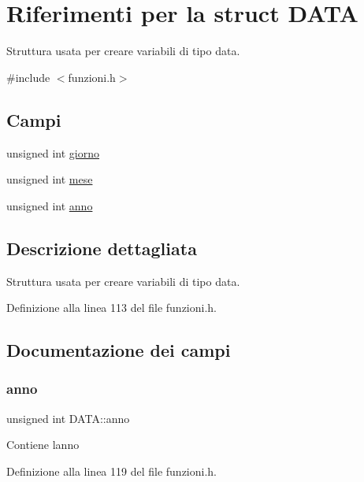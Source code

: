 \hypertarget{struct_d_a_t_a}{}\section{Riferimenti per la struct D\+A\+TA}
\label{struct_d_a_t_a}


Struttura usata per creare variabili di tipo data.  




{\ttfamily \#include $<$funzioni.\+h$>$}

\subsection*{Campi}
\begin{DoxyCompactItemize}
\item 
unsigned int \hyperlink{struct_d_a_t_a_a5b7ee538f851d6654690c7abd5a73e95}{giorno}
\item 
unsigned int \hyperlink{struct_d_a_t_a_a01ae59e2eaf050acfab59d94732ab535}{mese}
\item 
unsigned int \hyperlink{struct_d_a_t_a_a51652b7ccc3b63d704943414ded3c38a}{anno}
\end{DoxyCompactItemize}


\subsection{Descrizione dettagliata}
Struttura usata per creare variabili di tipo data. 

Definizione alla linea 113 del file funzioni.\+h.



\subsection{Documentazione dei campi}
\mbox{\label{struct_d_a_t_a_a51652b7ccc3b63d704943414ded3c38a}} 
\subsubsection{\texorpdfstring{anno}{anno}}
{\footnotesize\ttfamily unsigned int D\+A\+T\+A\+::anno}

Contiene l\textquotesingle{}anno 

Definizione alla linea 119 del file funzioni.\+h.



